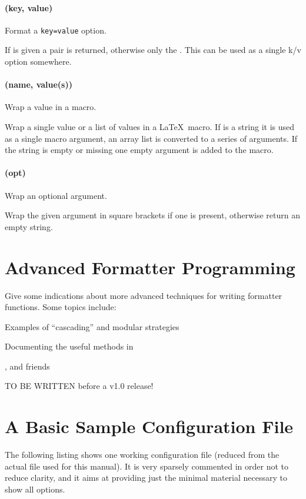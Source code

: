 \documentclass{scrartcl}
\begin{document}
\paragraph{ (key, value)}

Format a \texttt{key=value} option.

If  is given a \value{key=value} pair is returned, otherwise only
the .  This can be used as a single k/v option somewhere.


\paragraph{ (name, value(s))}

Wrap a value in a macro.

Wrap a single value or a list of values in a \LaTeX\ macro. If  is
a string it is used as a single macro argument, an array list is converted to a
series of arguments. If the string is empty or missing one empty argument is
added to the macro.


\paragraph{ (opt)}

Wrap an optional argument.

Wrap the given argument in square brackets if one is present, otherwise return
an empty string.




\section{Advanced Formatter Programming}
\label{sec:advanced-programming}

Give some indications about more advanced techniques for writing formatter functions. Some topics include:

\begin{itemize*}
\item Examples of “cascading” and modular strategies
\item Documenting the useful methods in 
\item {},  and friends
\end{itemize*}

TO BE WRITTEN before a v1.0 release!

\pagebreak
\section{A Basic Sample Configuration File}
\label{sec:basic-sample-config}

The following listing shows one working configuration file (reduced from the
actual file used for this manual). It is very sparsely commented in order not to
reduce clarity, and it aims at providing just the minimal material necessary to
show all options.

\inputminted{lua}{luatemplates-config-basic.lua}
\end{document}
